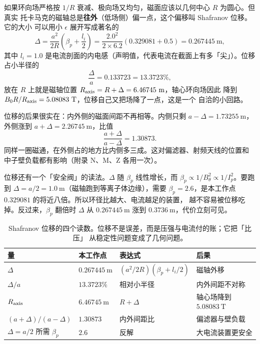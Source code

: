 如果环向场严格按 $1/R$ 衰减、极向场又均匀，磁面应该以几何中心 $R$ 为圆心。但真实
托卡马克的磁轴总是\textbf{往外}（低场侧）偏一点，这个偏移叫 Shafranov 位移。它的大小
可以用小 $\epsilon$ 展开写成著名的
\begin{equation}
\Delta = \frac{a^2}{2R}\left(\beta_p + \frac{l_i}{2}\right)
= \frac{2.0^2}{2\times6.2}\left(0.329081 + 0.5\right) = 0.267445\ \mathrm{m},
\label{eq:app-ag-shift}
\end{equation}
其中 $l_i=1.0$ 是电流剖面的内电感（声明值，代表电流在截面上有多「尖」）。位移占小半径的
\begin{equation}
\frac{\Delta}{a} = 0.133723 = 13.3723\%,
\label{eq:app-ag-gap}
\end{equation}
放在 $R$ 上就是磁轴位置 $R_{\rm axis} = R+\Delta = 6.46745\ \mathrm{m}$，轴心环向场因此
降到 $B_0R/R_{\rm axis} = 5.08083\ \mathrm{T}$，位移自己又把场降了一点，这是一个
自洽的小回路。

位移的后果很实在：内外侧的磁面间距不再相等。内侧只剩 $a-\Delta = 1.73255\ \mathrm{m}$，
外侧涨到 $a+\Delta = 2.26745\ \mathrm{m}$，比值
\begin{equation}
\frac{a+\Delta}{a-\Delta} = 1.30873.
\label{eq:app-ag-axis}
\end{equation}
同样一圈磁通，在外侧占的地方比内侧多三成。这对偏滤器、射频天线的位置和
中子壁负载都有影响（附录 N、M、Z 各用一次）。

位移还有一个「安全阀」的读法。$\Delta$ 随 $\beta_p$ 线性增长，而 $\beta_p\propto 1/B_\theta^2
\propto 1/I_p^2$。要跑到 $\Delta=a/2=1.0\ \mathrm{m}$（磁轴跑到等离子体边缘），需要
$\beta_p = 2.6$，是本工作点 $0.329081$ 的将近八倍。所以环径比越大、电流越足的装置，
越不容易被位移吃掉。反过来，$\beta_p$ 翻倍时 $\Delta$ 从 $0.267445\ \mathrm{m}$ 涨到
$0.3736\ \mathrm{m}$，代价立刻可见。

\begin{table}[htbp]
\centering
\small
\caption{Shafranov 位移的四个读数。位移不是误差，而是压强与电流付的账；它把「比压」
从稳定性问题变成了几何问题。}
\label{tab:app-ag-shift}
\begin{tabular}{p{4.0cm}p{3.0cm}p{3.6cm}p{4.2cm}}
\toprule
量 & 本工作点 & 表达式 & 后果 \\
\midrule
$\Delta$ & $0.267445\ \mathrm{m}$ & $(a^2/2R)(\beta_p+l_i/2)$ & 磁轴外移 \\
$\Delta/a$ & $13.3723\%$ & 相对小半径 & 内外间距不对称 \\
$R_{\rm axis}$ & $6.46745\ \mathrm{m}$ & $R+\Delta$ & 轴心场降到 $5.08083\ \mathrm{T}$ \\
$(a+\Delta)/(a-\Delta)$ & $1.30873$ & 内外间距比 & 偏滤器与壁负载 \\
$\Delta=a/2$ 所需 $\beta_p$ & $2.6$ & 反解 & 大电流装置更安全 \\
\bottomrule
\end{tabular}

\end{table}

